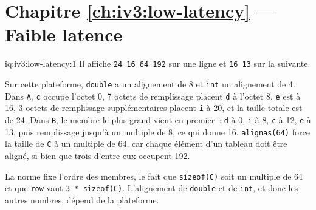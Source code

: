\section*{Chapitre \ref{ch:iv3:low-latency} --- Faible latence}

\begin{solution}{iq:iv3:low-latency:1}
Il affiche \texttt{24 16 64 192} sur une ligne et \texttt{16 13} sur la suivante.

Sur cette plateforme, \texttt{double} a un alignement de 8 et \texttt{int} un alignement de 4. Dans \texttt{A}, \texttt{c} occupe l'octet 0, 7 octets de remplissage placent \texttt{d} à l'octet 8, \texttt{e} est à 16, 3 octets de remplissage supplémentaires placent \texttt{i} à 20, et la taille totale est de 24. Dans \texttt{B}, le membre le plus grand vient en premier~: \texttt{d} à 0, \texttt{i} à 8, \texttt{c} à 12, \texttt{e} à 13, puis remplissage jusqu'à un multiple de 8, ce qui donne 16. \texttt{alignas(64)} force la taille de \texttt{C} à un multiple de 64, car chaque élément d'un tableau doit être aligné, si bien que trois d'entre eux occupent 192.

La norme fixe l'ordre des membres, le fait que \texttt{sizeof(C)} soit un multiple de 64 et que \texttt{row} vaut \texttt{3 * sizeof(C)}. L'alignement de \texttt{double} et de \texttt{int}, et donc les autres nombres, dépend de la plateforme.

\end{solution}

